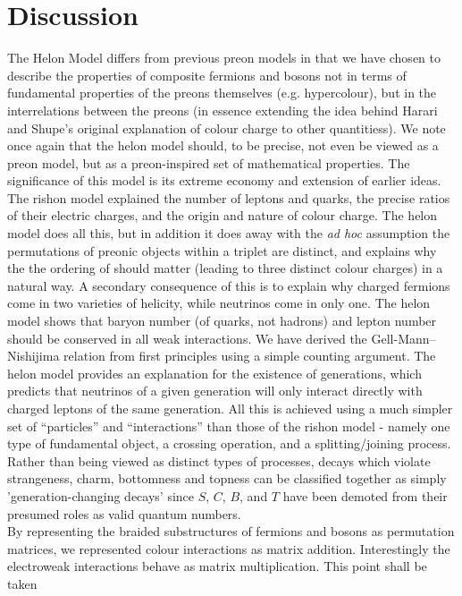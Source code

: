 \documentclass[twocolumn,showpacs,preprintnumbers,amsmath,amssymb]{revtex4}
\begin{document}
\section{Discussion}
\label{sec:discussion}
The Helon Model differs from previous preon models in that we have chosen to 
describe the properties of composite fermions and bosons not in terms of 
fundamental properties of the preons themselves (e.g. hypercolour), but in the 
interrelations between the preons (in essence extending the idea behind 
Harari and Shupe's original explanation of colour charge to other quantitiess). 
We note once again that the helon model should, to be precise, not even be viewed 
as a preon model, but as a preon-inspired set of mathematical properties.
The significance of this model is its extreme economy and extension of earlier 
ideas. The rishon model explained the number of leptons and quarks, the precise
ratios of their electric charges, and the origin and nature of colour charge.
The helon model does all this, but in addition it does away with the {\em ad hoc} 
assumption the permutations of preonic objects within a triplet are distinct, and 
explains why the the ordering of should matter (leading to three distinct colour 
charges) in a natural way. A secondary consequence of this is to explain why charged 
fermions come in two varieties of helicity, while neutrinos come in only one. The 
helon model shows that baryon number (of quarks, not hadrons) and lepton number 
should be conserved in all weak interactions. We have derived the 
Gell-Mann--Nishijima relation from first principles using a simple counting argument.
The helon model provides an explanation for the existence of generations, which 
predicts that neutrinos of a given generation will only interact directly with 
charged leptons of the same generation. All this is achieved using a much simpler 
set of ``particles'' and ``interactions'' than those of the rishon model - namely 
one type of fundamental object, a crossing operation, and a splitting/joining 
process.\\
Rather than being viewed as distinct types of processes, decays which violate 
strangeness, charm, bottomness and topness can be classified together as simply 
'generation-changing decays' since $S$, $C$, $B$, and $T$ have been demoted from 
their presumed roles as valid quantum numbers.\\ 
By representing the braided substructures of fermions and bosons as permutation 
matrices, we represented colour interactions as matrix addition. Interestingly the 
electroweak interactions behave as matrix multiplication. This point shall be taken 
\end{document}
